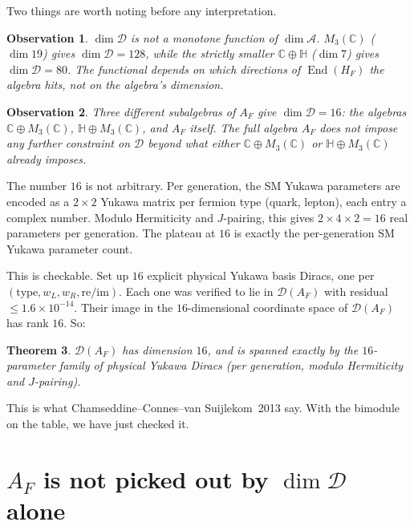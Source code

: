 \documentclass[11pt,a4paper]{article}
\newtheorem{theorem}{Theorem}
\newtheorem{observation}[theorem]{Observation}
\begin{document}
\bigskip

Two things are worth noting before any interpretation.

\begin{observation}\label{obs:nonmonotone}
$\dim \mathcal{D}$ is \emph{not} a monotone function of $\dim \mathcal{A}$.
$M_3(\mathbb{C})$ ($\dim 19$) gives $\dim \mathcal{D} = 128$, while the strictly
smaller $\mathbb{C} \oplus \mathbb{H}$ ($\dim 7$) gives $\dim \mathcal{D} = 80$.
The functional depends on which directions of $\operatorname{End}(H_F)$ the
algebra hits, not on the algebra's dimension.
\end{observation}

\begin{observation}\label{obs:plateau}
Three different subalgebras of $A_F$ give $\dim \mathcal{D} = 16$: the algebras
$\mathbb{C} \oplus M_3(\mathbb{C})$, $\mathbb{H} \oplus M_3(\mathbb{C})$, and
$A_F$ itself. The full algebra $A_F$ does not impose any further constraint on
$\mathcal{D}$ beyond what either $\mathbb{C} \oplus M_3(\mathbb{C})$ or
$\mathbb{H} \oplus M_3(\mathbb{C})$ already imposes.
\end{observation}

The number $16$ is not arbitrary. Per generation, the SM Yukawa parameters are
encoded as a $2 \times 2$ Yukawa matrix per fermion type (quark, lepton),
each entry a complex number. Modulo Hermiticity and $J$-pairing, this gives
$2 \times 4 \times 2 = 16$ real parameters per generation. The plateau at $16$
is exactly the per-generation SM Yukawa parameter count.

This is checkable. Set up $16$ explicit physical Yukawa basis Diracs, one per
$(\mathrm{type}, w_L, w_R, \mathrm{re}/\mathrm{im})$. Each one was verified to
lie in $\mathcal{D}(A_F)$ with residual $\le 1.6 \times 10^{-14}$. Their image
in the $16$-dimensional coordinate space of $\mathcal{D}(A_F)$ has rank $16$.
So:

\begin{theorem}\label{thm:exactly-yukawa}
$\mathcal{D}(A_F)$ has dimension $16$, and is spanned exactly by the
$16$-parameter family of physical Yukawa Diracs (per generation, modulo
Hermiticity and $J$-pairing).
\end{theorem}

This is what Chamseddine--Connes--van Suijlekom~2013 say. With the bimodule on
the table, we have just checked it.

\section{$A_F$ is not picked out by $\dim \mathcal{D}$ alone}\label{sec:nonunique}
\end{document}
